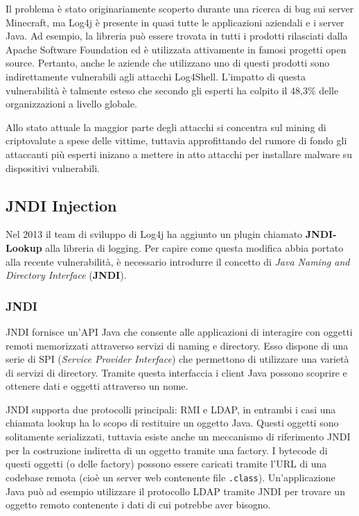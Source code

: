 \documentclass[a4paper, 12pt]{article}
\begin{document}
Il problema è stato originariamente scoperto durante una ricerca di bug sui server Minecraft, ma Log4j è presente in quasi tutte le applicazioni aziendali e i server Java.
Ad esempio, la libreria può essere trovata in tutti i prodotti rilasciati dalla Apache Software Foundation ed è utilizzata attivamente in famosi progetti open source.
Pertanto, anche le aziende che utilizzano uno di questi prodotti sono indirettamente vulnerabili agli attacchi Log4Shell.
L'impatto di questa vulnerabilità è talmente esteso che secondo gli esperti ha colpito il 48,3\% delle organizzazioni a livello globale. 

Allo stato attuale la maggior parte degli attacchi si concentra sul mining di criptovalute a spese delle vittime, tuttavia approfittando del rumore di fondo gli attaccanti più esperti inizano a mettere in atto attacchi per installare malware su dispositivi vulnerabili. 


\subsection{JNDI Injection}
Nel 2013 il team di sviluppo di Log4j ha aggiunto un plugin chiamato \textbf{JNDI-Lookup} alla libreria di logging. Per capire come questa modifica abbia portato alla recente vulnerabilità, è necessario introdurre il concetto di \emph{Java Naming and Directory Interface} (\textbf{JNDI}).


\subsubsection{JNDI}
JNDI fornisce un'API Java che consente alle applicazioni di interagire con oggetti remoti memorizzati attraverso servizi di naming e directory.
Esso dispone di una serie di SPI (\emph{Service Provider Interface}) che permettono di utilizzare una varietà di servizi di directory.
Tramite questa interfaccia i client Java possono scoprire e ottenere dati e oggetti attraverso un nome. 

JNDI supporta due protocolli principali: RMI e LDAP, in entrambi i casi una chiamata lookup ha lo scopo di restituire un oggetto Java. Questi oggetti sono solitamente serializzati, tuttavia esiste anche un meccanismo di riferimento JNDI per la costruzione indiretta di un oggetto tramite una factory.
I bytecode di questi oggetti (o delle factory) possono essere caricati tramite l'URL di una codebase remota (cioè un server web contenente file \verb!.class!). Un'applicazione Java può ad esempio utilizzare il protocollo LDAP tramite JNDI per trovare un oggetto remoto contenente i dati di cui potrebbe aver bisogno.
\end{document}
